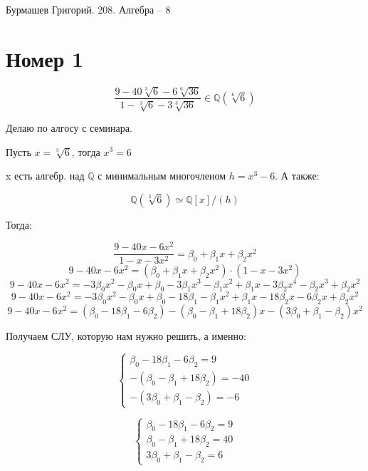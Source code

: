 \documentclass[a4paper,12pt]{article}
\author{Бурмашев Григорий, БПМИ-208}
\title{}
\date{\today}
\begin{document}
\begin{center}
Бурмашев Григорий. 208. Алгебра -- 8
\end{center}
\section*{Номер 1}
\[
\frac{9 - 40\sqrt[3]{6} -6 \sqrt[6]{36}}{1 - \sqrt[3]{6} - 3\sqrt[3]{36}} \in \mathbb{Q}(\sqrt[6]{6})
\]

\begin{center}
Делаю по алгосу с семинара.
\end{center}

Пусть $x = \sqrt[3]{6}$, тогда $x^3 = 6$

x есть алгебр. над $\mathbb{Q}$ с минимальным многочленом $h = x^3 - 6$. А также:

\[
\mathbb{Q}(\sqrt[3]{6}) \simeq \mathbb{Q}[x]/(h)
\]

Тогда:

\[
\frac{9-40x-6x^2}{1-x-3x^2} = \beta_0 + \beta_1x + \beta_2x^2
\]
\[
9-40x - 6x^2 = ( \beta_0 + \beta_1x + \beta_2x^2) \cdot (1 - x -3x^2)
\]
\[
9-40x-6x^2 = -3\beta_0x^2 - \beta_0 x + \beta_0 - 3\beta_1x^3 - \beta_1x^2 + \beta_1 x - 3\beta_2x^4 - \beta_2x^3 + \beta_2x^2
\]
\[
9-40x-6x^2 = -3\beta_0x^2 - \beta_0 x + \beta_0 - 18\beta_1 - \beta_1x^2 + \beta_1 x - 18\beta_2x - 6\beta_2x + \beta_2x^2
\]
\[
9-40x-6x^2 = (\beta_0 - 18\beta_1 - 6\beta_2) - (\beta_0 - \beta_1 + 18\beta_2)x - (3\beta_0 +\beta_1 - \beta_2)x^2
\]

Получаем СЛУ, которую нам нужно решить, а именно:

\[
\begin{cases}
\beta_0 - 18\beta_1 - 6\beta_2 = 9 \\
-(\beta_0 - \beta_1 + 18\beta_2)  = -40\\
 -(3\beta_0 + \beta_1 - \beta_2) = -6
\end{cases}
\]

\[
\begin{cases}
\beta_0 - 18\beta_1 - 6\beta_2 = 9 \\
\beta_0 - \beta_1 + 18\beta_2 = 40\\
3\beta_0 + \beta_1 - \beta_2 = 6
\end{cases}
\]
\end{document}
